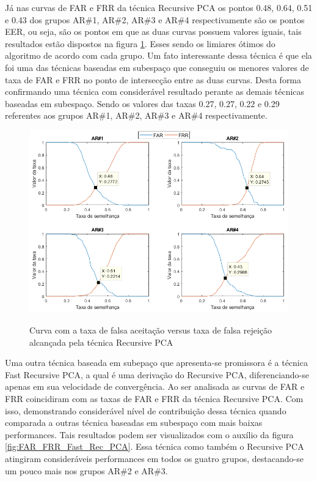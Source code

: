 Já nas curvas de FAR e FRR da técnica Recursive PCA os pontos 0.48, 0.64, 0.51 e 0.43 dos grupos AR\#1, AR\#2, AR\#3 e AR\#4 respectivamente são os pontos EER, ou seja, são os pontos em que as duas curvas possuem valores iguais, tais resultados estão dispostos na figura \ref{fig:FAR_FRR_Rec_PCA}. Esses sendo os limiares ótimos do algoritmo de acordo com cada grupo. Um fato interessante dessa técnica é que ela foi uma das técnicas baseadas em subespaço que conseguiu os menores valores de taxa de FAR e FRR no ponto de intersecção entre as duas curvas. Desta forma confirmando uma técnica com considerável resultado perante as demais técnicas baseadas em subespaço. Sendo os valores das taxas 0.27, 0.27, 0.22 e 0.29 referentes aos grupos AR\#1, AR\#2, AR\#3 e AR\#4 respectivamente.


\begin{figure}[H]
\centering
\caption{Curva com a taxa de falsa aceitação versus taxa de falsa rejeição alcançada pela técnica Recursive PCA}
\includegraphics[scale=0.55]{imgs4/graficos_FAR_FRR/RecPCA}
\label{fig:FAR_FRR_Rec_PCA}
\end{figure}


Uma outra técnica baseada em subepaço que apresenta-se promissora é a técnica Fast Recursive PCA, a qual é uma derivação do Recursive PCA, diferenciando-se apenas em sua velocidade de convergência. Ao ser analisada as curvas de FAR e FRR coincidiram com as taxas de FAR e FRR da técnica Recursive PCA. Com isso, demonstrando considerável nível de contribuição dessa técnica quando comparada a outras técnica baseadas em subespaço com mais baixas performances. Tais resultados podem ser visualizados com o auxílio da figura \ref{fig:FAR_FRR_Fast_Rec_PCA}. Essa técnica como também o Recursive PCA atingiram consideráveis performances em todos os guatro grupos, destacando-se um pouco mais nos grupos AR\#2 e AR\#3.


